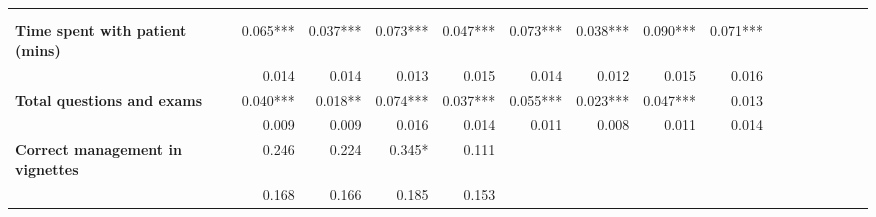 \begin{tabular}{@{\extracolsep{5pt}}lrrrrrrrrrrrrrrr}
\toprule
&  &  &  &  &  &  &  &  \\
{\bf } &  &  &  &  &  &  &  &  \\
\hline
{\bf Time spent with patient (mins)} & 0.065*** & 0.037*** & 0.073*** & 0.047*** & 0.073*** & 0.038*** & 0.090*** & 0.071*** \\
{\bf } & 0.014\phantom{***} & 0.014\phantom{***} & 0.013\phantom{***} & 0.015\phantom{***} & 0.014\phantom{***} & 0.012\phantom{***} & 0.015\phantom{***} & 0.016\phantom{***} \\
{\bf Total questions and exams} & 0.040*** & 0.018**\phantom{*} & 0.074*** & 0.037*** & 0.055*** & 0.023*** & 0.047*** & 0.013\phantom{***} \\
{\bf } & 0.009\phantom{***} & 0.009\phantom{***} & 0.016\phantom{***} & 0.014\phantom{***} & 0.011\phantom{***} & 0.008\phantom{***} & 0.011\phantom{***} & 0.014\phantom{***} \\
{\bf Correct management in vignettes} & 0.246\phantom{***} & 0.224\phantom{***} & 0.345*\phantom{**} & 0.111\phantom{***} & \phantom{***} & \phantom{***} & \phantom{***} & \phantom{***} \\
{\bf } & 0.168\phantom{***} & 0.166\phantom{***} & 0.185\phantom{***} & 0.153\phantom{***} & \phantom{***} & \phantom{***} & \phantom{***} & \phantom{***} \\

\end{tabular}
